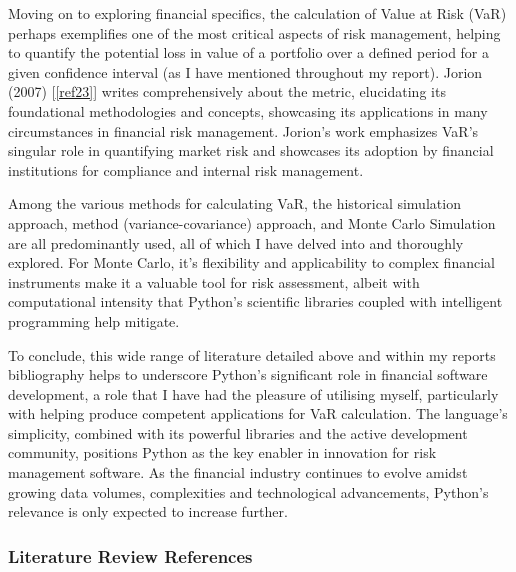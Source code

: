 \documentclass{article}
\begin{document}
Moving on to exploring financial specifics, the calculation of Value at Risk (VaR) perhaps exemplifies one of the most critical aspects of risk management, helping to quantify the potential loss in value of a portfolio over a defined period for a given confidence interval (as I have mentioned throughout my report). Jorion (2007) [\ref{ref23}] writes comprehensively about the metric, elucidating its foundational methodologies and concepts, showcasing its applications in many circumstances in financial risk management. Jorion's work emphasizes VaR's singular role in quantifying market risk and showcases its adoption by financial institutions for compliance and internal risk management.\\\vspace{0.3cm}

Among the various methods for calculating VaR, the historical simulation approach, method (variance-covariance) approach, and Monte Carlo Simulation are all predominantly used, all of which I have delved into and thoroughly explored. For Monte Carlo, it's flexibility and applicability to complex financial instruments make it a valuable tool for risk assessment, albeit with computational intensity that Python's scientific libraries coupled with intelligent programming help mitigate.\\\vspace{0.3cm}

To conclude, this wide range of literature detailed above and within my reports bibliography helps to underscore Python's significant role in financial software development, a role that I have had the pleasure of utilising myself, particularly with helping produce competent applications for VaR calculation. The language's simplicity, combined with its powerful libraries and the active development community, positions Python as the key enabler in innovation for risk management software. As the financial industry continues to evolve amidst growing data volumes, complexities and technological advancements, Python's relevance is only expected to increase further.

\subsubsection{Literature Review References}
\end{document}
